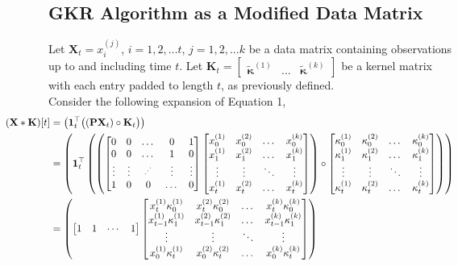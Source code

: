 \documentclass{article}
\begin{document}
	\subsection*{GKR Algorithm as a Modified Data Matrix}
	Let $\mathbf{X}_t = x_i^{(j)}$, $i = 1, 2, \dots t$, $j = 1, 2, \dots k$ be a data matrix containing observations up to and including time $t$. Let $\mathbf{K}_t = \begin{bmatrix}
		\tilde{\boldsymbol{\kappa}}^{(1)} & \dots & \tilde{\boldsymbol{\kappa}}^{(k)}
	\end{bmatrix}$ be a kernel matrix with each entry padded to length $t$, as previously defined. \\
	Consider the following expansion of Equation 1,	\begin{align*}\hspace{-1.5cm}
			(\mathbf{X} \ast \mathbf{K})[t]  &=  \left( {\mathbf{1}}_t^{\top}\big( (\mathbf{P} \mathbf{X}_t ) \circ \mathbf{K}_t\big)  \right)\\
			&=  \left( \mathbf{1}_t^{\top} \left( \left( \begin{bmatrix} 0  & 0 & \dots & 0& 1 \\ 0  & 0 & \dots & 1& 0 \\ 
				\vdots & \vdots &  {{\scriptstyle\cdot^{\scriptstyle\cdot^{\scriptstyle\cdot}}}}
				& \vdots & \vdots \\ 1 & 0 & 0 & \dots &0\end{bmatrix} \begin{bmatrix} x_0^{(1)} & x_0^{(2)}  & \dots & x_0^{(k)}\\ x_1^{(1)} & x_1^{(2)}& \dots & x_1^{(k)}\\ \vdots & \vdots & \ddots & \vdots \\ x_t^{(1)} &  x_t^{(2)} & \dots &  x_t^{(k)} \end{bmatrix} \right)\circ\begin{bmatrix} \kappa_0^{(1)} &\kappa_0^{(2)} & \dots &\kappa_0^{(k)}\\ \kappa_1^{(1)} &\kappa_1^{(2)} & \dots &\kappa_1^{(k)} \\ \vdots & \vdots & \ddots & \vdots \\ \kappa_t^{(1)} &\kappa_t^{(2)} & \dots &\kappa_t^{(k)} \end{bmatrix} \right)   \right) \\
			&=  \left( \begin{bmatrix} 1 & 1 & \cdots & 1 \end{bmatrix}  \begin{bmatrix} x_t^{(1)} \kappa_0^{(1)} & x_t^{(2)} \kappa_0^{(2)} & \dots & x_t^{(k)} \kappa_0^{(k)}\\ x^{(1)}_{t-1}\kappa_1^{(1)} &x^{(2)}_{t-1}\kappa_1^{(2)} & \dots &x^{(k)}_{t-1}\kappa_1^{(k)} \\ \vdots & \vdots & \ddots & \vdots \\ x^{(1)}_0\kappa_t^{(1)} & x^{(2)}_0\kappa_t^{(2)} & \dots &x^{(k)}_0\kappa_t^{(k)} \end{bmatrix}  \right) \\

\end{align*}
\end{document}

